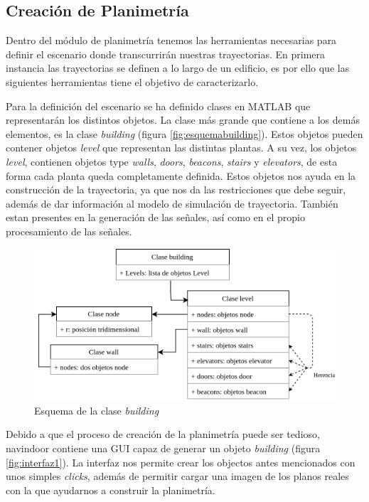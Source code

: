 
\subsection{Creación de Planimetría}

Dentro del módulo de planimetría tenemos las herramientas necesarias para definir el escenario donde transcurrirán nuestras trayectorias. En primera instancia las trayectorias se definen a lo largo de un edificio, es por ello que las siguientes herramientas tiene el objetivo de caracterizarlo.   

Para la definición del escenario se ha definido clases en MATLAB que representarán los distintos objetos. La clase más grande que contiene a los demás elementos, es la clase \emph{building} (figura \ref{fig:esquemabuilding}). Estos objetos pueden contener objetos \emph{level} que representan las distintas plantas. A su vez, los objetos \emph{level}, contienen objetos type \emph{walls}, \emph{doors}, \emph{beacons}, \emph{stairs} y \emph{elevators}, de esta forma cada planta queda completamente definida. Estos objetos nos ayuda en la construcción de la trayectoria, ya que nos da las restricciones que debe seguir, además de dar información al modelo de simulación de trayectoria. También estan presentes en la generación de las señales, así como en el propio procesamiento de las señales. 

\begin{figure}[!ht]
    \centering
    \includegraphics[width=1.0     \columnwidth]{img/Design/planimetria.png} 
    \caption[]{Esquema de la clase \emph{building}}
    \footnotesize
    \label{fig:esquemabuilding1}
\end{figure}

Debido a que el proceso de creación de la planimetría puede ser tedioso, navindoor contiene una GUI capaz de generar un objeto \emph{building} (figura \ref{fig:interfaz1}). La interfaz nos permite crear los objectos antes mencionados con unos simples \emph{clicks}, además de permitir cargar una imagen de los planos reales con la que ayudarnos a construir la planimetría. 

